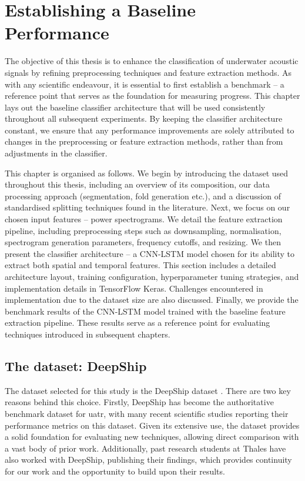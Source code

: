 \chapter{Establishing a Baseline Performance}


The objective of this thesis is to enhance the classification of underwater acoustic signals by refining preprocessing techniques and feature extraction methods. As with any scientific endeavour, it is essential to first establish a benchmark -- a reference point that serves as the foundation for measuring progress. This chapter lays out the baseline classifier architecture that will be used consistently throughout all subsequent experiments. By keeping the classifier architecture constant, we ensure that any performance improvements are solely attributed to changes in the preprocessing or feature extraction methods, rather than from adjustments in the classifier.

This chapter is organised as follows. We begin by introducing the dataset used throughout this thesis, including an overview of its composition, our data processing approach (segmentation, fold generation etc.), and a discussion of standardised splitting techniques found in the literature. Next, we focus on our chosen input features -- power spectrograms. We detail the feature extraction pipeline, including preprocessing steps such as downsampling, normalisation, spectrogram generation parameters, frequency cutoffs, and resizing. We then present the classifier architecture -- a CNN-LSTM model chosen for its ability to extract both spatial and temporal features. This section includes a detailed architecture layout, training configuration, hyperparameter tuning strategies, and implementation details in TensorFlow Keras. Challenges encountered in implementation due to the dataset size are also discussed. Finally, we provide the benchmark results of the CNN-LSTM model trained with the baseline feature extraction pipeline. These results serve as a reference point for evaluating techniques introduced in subsequent chapters.

\section{The dataset: DeepShip}

The dataset selected for this study is the DeepShip dataset \cite{irfan_deepship_2021}. There are two key reasons behind this choice. Firstly, DeepShip has become the authoritative benchmark dataset for \acrshort{uatr}, with many recent scientific studies reporting their performance metrics on this dataset. Given its extensive use, the dataset provides a solid foundation for evaluating new techniques, allowing direct comparison with a vast body of prior work. Additionally, past research students at Thales have also worked with DeepShip, publishing their findings, which provides continuity for our work and the opportunity to build upon their results.


